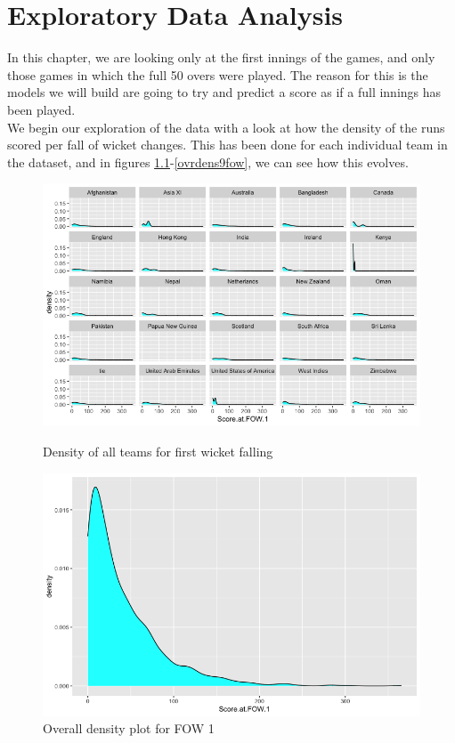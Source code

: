 \chapter{Exploratory Data Analysis}

In this chapter, we are looking only at the first innings of the games, and only those games in which the full 50 overs were played. The 
reason for this is the models we will build are going to try and predict a score as if a full innings has been played. \\

We begin our exploration of the data with a look at how the density of the runs scored per fall of wicket changes. This has been done for each
individual team in the dataset, and in figures \ref{ovrdens1fow}-\ref{ovrdens9fow}, we can see how this evolves.  

\begin{figure}[h]
    \centering
    \begin{minipage}{0.4\textwidth}
        \centering
        \includegraphics[scale=0.3]{figures/fow1density.png}
        \caption{Density of all teams for first wicket falling}
        \label{alldens1fow}
    \end{minipage}
    \begin{minipage}{0.4\textwidth}
        \centering
        \includegraphics[scale=0.3]{figures/fow1densFull.png}
        \caption{Overall density plot for FOW 1}
        \label{ovrdens1fow}
    \end{minipage}
\end{figure}

